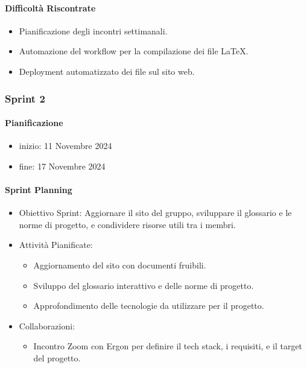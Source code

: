 \documentclass{article}
\begin{document}
                    \paragraph{Difficoltà Riscontrate}
                    \begin{itemize}
                        \item Pianificazione degli incontri settimanali.
                        \item Automazione del workflow per la compilazione dei file LaTeX.
                        \item Deployment automatizzato dei file sul sito web.
                    \end{itemize}
            \subsubsection{Sprint 2}
                \paragraph{Pianificazione}
                \begin{itemize}
                    \item inizio: 11 Novembre 2024
                    \item fine: 17 Novembre 2024
                \end{itemize}
                \paragraph{Sprint Planning}
                    \begin{itemize}
                        \item Obiettivo Sprint: Aggiornare il sito del gruppo, sviluppare il glossario e le norme di progetto, e condividere risorse utili tra i membri.
                        \item Attività Pianificate:
                            \begin{itemize}
                                \item Aggiornamento del sito con documenti fruibili.
                                \item Sviluppo del glossario interattivo e delle norme di progetto.
                                \item Approfondimento delle tecnologie da utilizzare per il progetto.
                            \end{itemize}
                        \item Collaborazioni:
                            \begin{itemize}
                                \item Incontro Zoom con Ergon per definire il tech stack, i requisiti, e il target del progetto.
                            \end{itemize}
                    \end{itemize}
\end{document}
